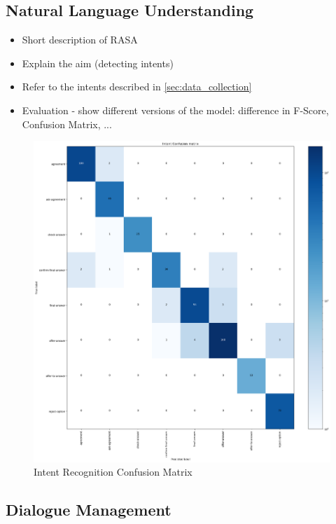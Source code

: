 \documentclass[hidelinks, 11pt]{article}
\begin{document}
\subsection{Natural Language Understanding}
\label{subsec:nlu}

\begin{itemize}
  \item Short description of RASA
  \item Explain the aim (detecting intents)
  \item Refer to the intents described in \ref{sec:data_collection} 
  \item Evaluation - show different versions of the model: difference in F-Score, Confusion Matrix, ...
\end{itemize}

\begin{figure}
  \includegraphics[width=\columnwidth]{../Rasa/Evaluation/Clean_Model/intent_confusion_matrix.png}
  \caption{Intent Recognition Confusion Matrix}
  \label{fig:intent_confusion_matrix}
\end{figure}

\subsection{Dialogue Management}
\label{subsec:dialogue_management}
\end{document}
